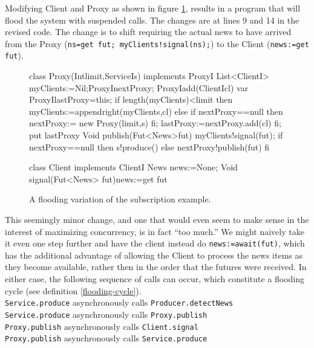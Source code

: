 \documentclass[12pt]{article}%
\begin{document}
Modifying Client and Proxy as shown in figure \ref{example-subscr-flooding}, results in a program that will flood the system with suspended calls. 
The changes are at lines 9 and 14 in the revised code.
The change is to shift requiring the actual news to have arrived from the Proxy (\lstinline{ns=get fut; myClients!signal(ns);})
to the Client (\lstinline{news:=get fut}).


\begin{figure}
\begin{abs}
class Proxy(Intlimit,ServiceIs) implements ProxyI{
  List<ClientI> myClients:=Nil;ProxyInextProxy;
  ProxyIadd(ClientIcl){
    var ProxyIlastProxy=this;
    if length(myClients)<limit then myClients:=appendright(myClients,cl)
    else if nextProxy==null then nextProxy:= new Proxy(limit,s) fi;
    lastProxy:=nextProxy.add(cl) fi; put lastProxy}
  Void publish(Fut<News>fut){
    myClients!signal(fut);
    if nextProxy==null then s!produce() else nextProxy!publish(fut) fi}}

class Client implements ClientI{
  News news:=None;
  Void signal(Fut<News> fut){news:=get fut}}

\end{abs}
\caption{\label{example-subscr-flooding}
A flooding variation of the subscription example.}
\end{figure}

This seemingly minor change, and one that would even seem to make sense in the interest of maximizing concurrency, is in
fact ``too much.'' We might naively take it even one step further and have the client instead do 
\lstinline{news:=await(fut)}, 
which has the additional advantage of allowing the Client to process the news items as they become available, rather then in
the order that the futures were received. In either case, the following sequence of calls can occur, which constitute a
flooding cycle (see definition \ref{flooding-cycle}).
\\

{\small
\samepage
\indent\lstinline{Service.produce} asynchronously calls \lstinline{Producer.detectNews}
\\
\indent\lstinline{Service.produce} asynchronously calls \lstinline{Proxy.publish}
\\
\indent\lstinline{Proxy.publish} asynchronously calls \lstinline{Client.signal}
\\
\indent\lstinline{Proxy.publish} asynchronously calls \lstinline{Service.produce}
}\\
\end{document}
